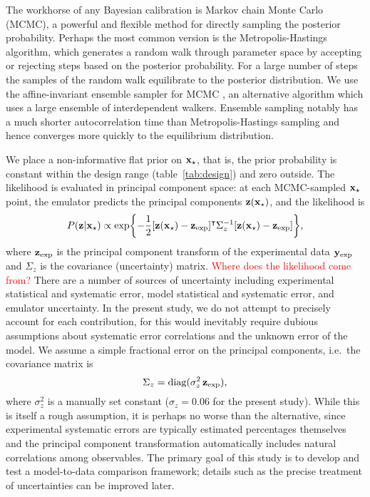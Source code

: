 \documentclass[aps,prc,reprint,amsmath]{revtex4-1}
\newcommand{\todo}[1]{\textcolor{red}{#1}}
\newcommand{\tran}{^\intercal}
\begin{document}
The workhorse of any Bayesian calibration is Markov chain Monte Carlo (MCMC), a powerful and flexible method for directly sampling the posterior probability.
Perhaps the most common version is the Metropolis-Hastings algorithm, which generates a random walk through parameter space by accepting or rejecting steps based on the posterior probability.
For a large number of steps the samples of the random walk equilibrate to the posterior distribution.
We use the affine-invariant ensemble sampler for MCMC \cite{Goodman:2010en,FM:2013mc}, an alternative algorithm which uses a large ensemble of interdependent walkers.
Ensemble sampling notably has a much shorter autocorrelation time than Metropolis-Hastings sampling and hence converges  more quickly to the equilibrium distribution. 

We place a non-informative flat prior on $\mathbf x_\star$, that is, the prior probability is constant within the design range (table~\ref{tab:design}) and zero outside.
The likelihood is evaluated in principal component space:
at each MCMC-sampled $\mathbf x_\star$ point, the emulator predicts the principal components $\mathbf z(\mathbf x_\star)$, and the likelihood is
\begin{equation}
  P(\z|\xs) \propto \exp\biggl\{ -\frac{1}{2} [\z(\xs) - \zexp]\tran \Sigma_z^{-1} [\z(\xs) - \zexp] \biggr\},
  \label{eq:likelihood}
\end{equation}
where $\mathbf z_\text{exp}$ is the principal component transform of the experimental data $\mathbf y_\text{exp}$ and $\Sigma_z$ is the covariance (uncertainty) matrix.
\todo{Where does the likelihood come from?}
There are a number of sources of uncertainty including experimental statistical and systematic error, model statistical and systematic error, and emulator uncertainty.
In the present study, we do not attempt to precisely account for each contribution, for this would inevitably require dubious assumptions about systematic error correlations and the unknown error of the model.
We assume a simple fractional error on the principal components, i.e.\ the covariance matrix is
\begin{equation}
  \Sigma_z = \text{diag}(\sigma^2_z\,\mathbf z_\text{exp}),
\end{equation}
where $\sigma^2_z$ is a manually set constant ($\sigma_z = 0.06$ for the present study).
While this is itself a rough assumption, it is perhaps no worse than the alternative, since experimental systematic errors are typically estimated percentages themselves and the principal component transformation automatically includes natural correlations among observables.
The primary goal of this study is to develop and test a model-to-data comparison framework; details such as the precise treatment of uncertainties can be improved later.
\end{document}
